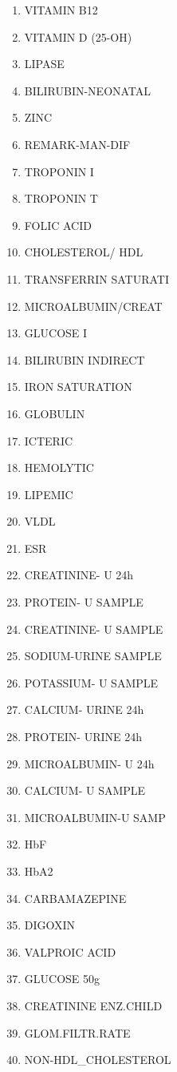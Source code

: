 \documentclass[a4paper,12pt]{article}
\begin{document}
\begin{appendices}
\begin{enumerate}
   			\item VITAMIN B12
   			\item VITAMIN D (25-OH)
   			\item LIPASE
   			\item BILIRUBIN-NEONATAL
   			\item ZINC
   			\item REMARK-MAN-DIF
   			\item TROPONIN I
   			\item TROPONIN T
   			\item FOLIC ACID
   			\item CHOLESTEROL/ HDL
   			\item TRANSFERRIN SATURATI
   			\item MICROALBUMIN/CREAT
   			\item GLUCOSE I
   			\item BILIRUBIN INDIRECT
   			\item IRON SATURATION
   			\item GLOBULIN
   			\item ICTERIC
   			\item HEMOLYTIC
   			\item LIPEMIC
   			\item VLDL
   			\item ESR
   			\item CREATININE- U 24h
   			\item PROTEIN- U SAMPLE
   			\item CREATININE- U SAMPLE
   			\item SODIUM-URINE SAMPLE
   			\item POTASSIUM- U SAMPLE
   			\item CALCIUM- URINE 24h
   			\item PROTEIN- URINE 24h
   			\item MICROALBUMIN- U 24h
   			\item CALCIUM- U SAMPLE
   			\item MICROALBUMIN-U SAMP
   			\item HbF
   			\item HbA2
   			\item CARBAMAZEPINE
   			\item DIGOXIN
   			\item VALPROIC ACID
   			\item GLUCOSE 50g
   			\item CREATININE ENZ.CHILD
   			\item GLOM.FILTR.RATE
   			\item NON-HDL\_CHOLESTEROL

\end{enumerate}
\end{appendices}
\end{document}
